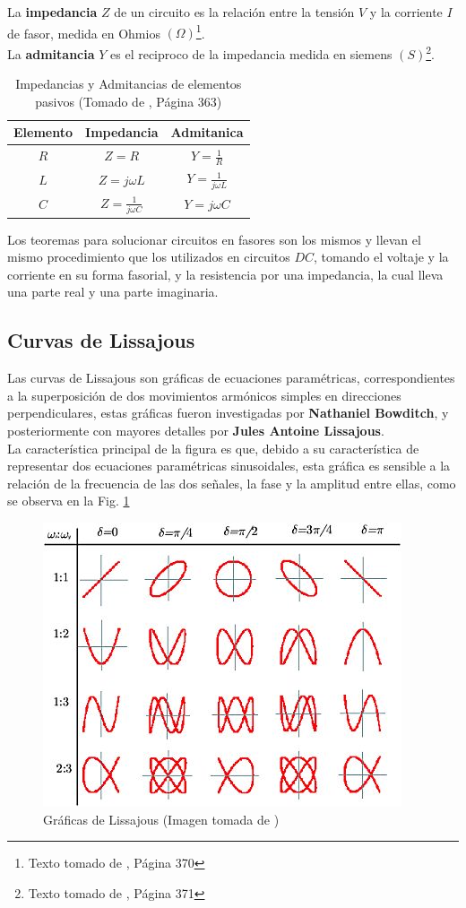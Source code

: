 \documentclass[twocolumn]{IEEEtran}
\begin{document}
\noindent
La \textbf{impedancia} $Z$ de un circuito es la relación entre la tensión  $V$ y la corriente $I$ de fasor, medida en Ohmios $(\Omega)$\footnote{Texto tomado de \cite{sadiku}, Página 370}.\\
La \textbf{admitancia} $Y$ es el reciproco de la impedancia medida en siemens $(S)$\footnote{Texto tomado de \cite{sadiku}, Página 371}.
\begin{table}[H]
	\centering
\begin{tabular}[c]{|c|c|c|} \hline
Elemento & Impedancia & Admitanica \\ \hline
$R$ & $Z = R$ & $Y = \frac{1}{R}$ \\
$L$ & $Z = j \omega L$ & $Y = \frac{1}{j \omega L}$ \\
$C$ & $Z = \frac{1}{j \omega C}$ & $Y = j \omega C$ \\ \hline
\end{tabular}
	\caption{Impedancias y Admitancias de elementos pasivos (Tomado de \cite{sadiku}, Página 363)}
	\label{tab2}
\end{table}
\noindent
Los teoremas para solucionar circuitos en fasores son los mismos y llevan el mismo procedimiento que los utilizados en circuitos $DC$, tomando el voltaje y la corriente en su forma fasorial, y la resistencia por una impedancia, la cual lleva una parte real y una parte imaginaria.

\subsection{Curvas de Lissajous}
\noindent
Las curvas de Lissajous son gráficas de ecuaciones paramétricas, correspondientes a la superposición de dos movimientos armónicos simples en direcciones perpendiculares,  estas gráficas fueron  investigadas por \textbf{Nathaniel Bowditch}, y posteriormente con mayores detalles por \textbf{Jules Antoine Lissajous}.\\
La característica principal de la figura es que, debido a su característica de representar dos ecuaciones paramétricas sinusoidales, esta gráfica es sensible a la relación de la frecuencia de las dos señales, la fase y la amplitud entre ellas, como se observa en la Fig. \ref{fig3}
\begin{figure}[H]
	\centering
		\includegraphics[scale=0.5]{lissa.png}
	\caption{Gráficas de Lissajous (Imagen tomada de \cite{page2})}
	\label{fig3}
\end{figure}
\end{document}
